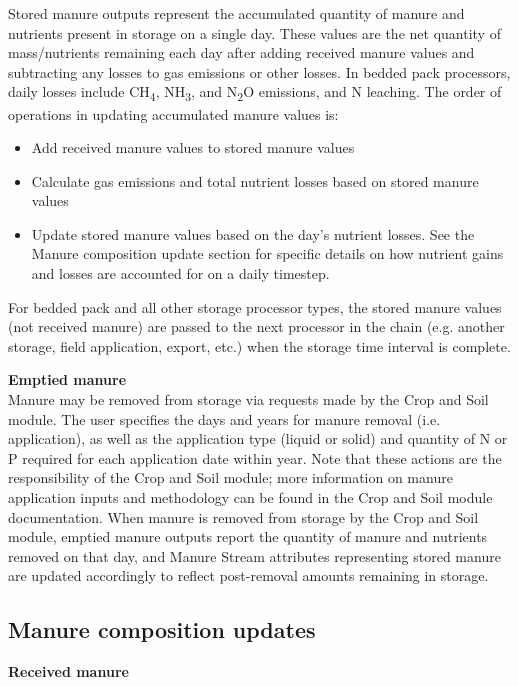 \begin{refsection}
Stored manure outputs represent the accumulated quantity of manure and nutrients present in storage on a single day. These values are the net quantity of mass/nutrients remaining each day after adding received manure values and subtracting any losses to gas emissions or other losses. In bedded pack processors, daily losses include CH\textsubscript{4}, NH\textsubscript{3}, and N\textsubscript{2}O emissions, and N leaching. The order of operations in updating accumulated manure values is: 
        \begin{itemize}
            \item Add received manure values to stored manure values
            \item Calculate gas emissions and total nutrient losses based on stored manure values
            \item Update stored manure values based on the day’s nutrient losses. See the Manure composition update section for specific details on how nutrient gains and losses are accounted for on a daily timestep. 
        \end{itemize}
\vspace{0.2cm}

For bedded pack and all other storage processor types, the stored manure values (not received manure) are passed to the next processor in the chain (e.g. another storage, field application, export, etc.) when the storage time interval is complete. 
\vspace{0.2cm}

\textbf{Emptied manure}\\
Manure may be removed from storage via requests made by the Crop and Soil module. The user specifies the days and years for manure removal (i.e. application), as well as the application type (liquid or solid) and quantity of N or P required for each application date within year. Note that these actions are the responsibility of the Crop and Soil module; more information on manure application inputs and methodology can be found in the Crop and Soil module documentation. When manure is removed from storage by the Crop and Soil module, emptied manure outputs report the quantity of manure and nutrients removed on that day, and Manure Stream attributes representing stored manure are updated accordingly to reflect post-removal amounts remaining in storage.

\vspace{0.2cm}

\subsection{Manure composition updates}
\textbf{Received manure}
\vspace{ 0.25cm}


\end{refsection}
